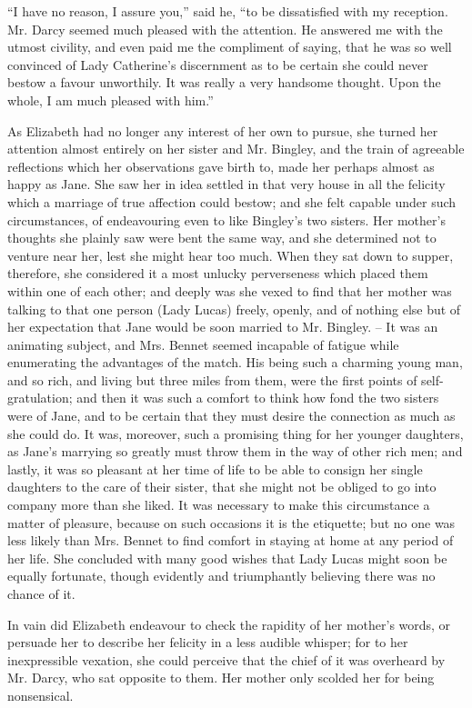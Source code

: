 “I have no reason, I assure you,” said he, “to be
dissatisfied with my reception. Mr. Darcy seemed much
pleased with the attention. He answered me with the
utmost civility, and even paid me the compliment of
saying, that he was so well convinced of Lady Catherine’s
discernment as to be certain she could never bestow
a favour unworthily. It was really a very handsome
thought. Upon the whole, I am much pleased with him.”

As Elizabeth had no longer any interest of her own to
pursue, she turned her attention almost entirely on her
sister and Mr. Bingley, and the train of agreeable reflections
which her observations gave birth to, made her
perhaps almost as happy as Jane. She saw her in idea
settled in that very house in all the felicity which a marriage
of true affection could bestow; and she felt capable
under such circumstances, of endeavouring even to like
Bingley’s two sisters. Her mother’s thoughts she plainly
saw were bent the same way, and she determined not to
venture near her, lest she might hear too much. When they
sat down to supper, therefore, she considered it a most
unlucky perverseness which placed them within one of
each other; and deeply was she vexed to find that her
mother was talking to that one person (Lady Lucas)
freely, openly, and of nothing else but of her expectation
that Jane would be soon married to Mr. Bingley. -- It was
an animating subject, and Mrs. Bennet seemed incapable
of fatigue while enumerating the advantages of the match.
His being such a charming young man, and so rich, and
living but three miles from them, were the first points
of self-gratulation; and then it was such a comfort to
think how fond the two sisters were of Jane, and to be
certain that they must desire the connection as much as
she could do. It was, moreover, such a promising thing for
her younger daughters, as Jane’s marrying so greatly
must throw them in the way of other rich men; and
lastly, it was so pleasant at her time of life to be able to
consign her single daughters to the care of their sister,
that she might not be obliged to go into company more
than she liked. It was necessary to make this circumstance
a matter of pleasure, because on such occasions
it is the etiquette; but no one was less likely than
Mrs. Bennet to find comfort in staying at home at any period
of her life. She concluded with many good wishes that
Lady Lucas might soon be equally fortunate, though
evidently and triumphantly believing there was no chance
of it.

In vain did Elizabeth endeavour to check the rapidity
of her mother’s words, or persuade her to describe her
felicity in a less audible whisper; for to her inexpressible
vexation, she could perceive that the chief of it
was overheard by Mr. Darcy, who sat opposite to them.
Her mother only scolded her for being nonsensical.

